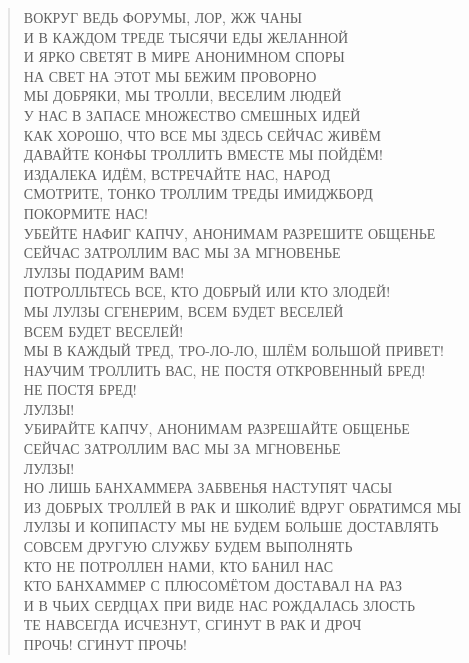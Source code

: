 \poemtitle{***}
\begin{verse}
ВОКРУГ ВЕДЬ ФОРУМЫ, ЛОР, ЖЖ ЧАНЫ\\
И В КАЖДОМ ТРЕДЕ ТЫСЯЧИ ЕДЫ ЖЕЛАННОЙ\\
И ЯРКО СВЕТЯТ В МИРЕ АНОНИМНОМ СПОРЫ\\
НА СВЕТ НА ЭТОТ МЫ БЕЖИМ ПРОВОРНО\\
МЫ ДОБРЯКИ, МЫ ТРОЛЛИ, ВЕСЕЛИМ ЛЮДЕЙ\\
У НАС В ЗАПАСЕ МНОЖЕСТВО СМЕШНЫХ ИДЕЙ\\
КАК ХОРОШО, ЧТО ВСЕ МЫ ЗДЕСЬ СЕЙЧАС ЖИВЁМ\\
ДАВАЙТЕ КОНФЫ ТРОЛЛИТЬ ВМЕСТЕ МЫ ПОЙДЁМ!\\
ИЗДАЛЕКА ИДЁМ, ВСТРЕЧАЙТЕ НАС, НАРОД\\
СМОТРИТЕ, ТОНКО ТРОЛЛИМ ТРЕДЫ ИМИДЖБОРД\\
ПОКОРМИТЕ НАС!\\
УБЕЙТЕ НАФИГ КАПЧУ, АНОНИМАМ РАЗРЕШИТЕ ОБЩЕНЬЕ\\
СЕЙЧАС ЗАТРОЛЛИМ ВАС МЫ ЗА МГНОВЕНЬЕ\\
ЛУЛЗЫ ПОДАРИМ ВАМ!\\
ПОТРОЛЛЬТЕСЬ ВСЕ, КТО ДОБРЫЙ ИЛИ КТО ЗЛОДЕЙ!\\
МЫ ЛУЛЗЫ СГЕНЕРИМ, ВСЕМ БУДЕТ ВЕСЕЛЕЙ\\
ВСЕМ БУДЕТ ВЕСЕЛЕЙ!\\
МЫ В КАЖДЫЙ ТРЕД, ТРО-ЛО-ЛО, ШЛЁМ БОЛЬШОЙ ПРИВЕТ!\\
НАУЧИМ ТРОЛЛИТЬ ВАС, НЕ ПОСТЯ ОТКРОВЕННЫЙ БРЕД!\\
НЕ ПОСТЯ БРЕД!\\
ЛУЛЗЫ!\\
УБИРАЙТЕ КАПЧУ, АНОНИМАМ РАЗРЕШАЙТЕ ОБЩЕНЬЕ\\
СЕЙЧАС ЗАТРОЛЛИМ ВАС МЫ ЗА МГНОВЕНЬЕ\\
ЛУЛЗЫ!\\
НО ЛИШЬ БАНХАММЕРА ЗАБВЕНЬЯ НАСТУПЯТ ЧАСЫ\\
ИЗ ДОБРЫХ ТРОЛЛЕЙ В РАК И ШКОЛИЁ ВДРУГ ОБРАТИМСЯ МЫ\\
ЛУЛЗЫ И КОПИПАСТУ МЫ НЕ БУДЕМ БОЛЬШЕ ДОСТАВЛЯТЬ\\
СОВСЕМ ДРУГУЮ СЛУЖБУ БУДЕМ ВЫПОЛНЯТЬ\\
КТО НЕ ПОТРОЛЛЕН НАМИ, КТО БАНИЛ НАС\\
КТО БАНХАММЕР С ПЛЮСОМЁТОМ ДОСТАВАЛ НА РАЗ\\
И В ЧЬИХ СЕРДЦАХ ПРИ ВИДЕ НАС РОЖДАЛАСЬ ЗЛОСТЬ\\
ТЕ НАВСЕГДА ИСЧЕЗНУТ, СГИНУТ В РАК И ДРОЧ\\
ПРОЧЬ! СГИНУТ ПРОЧЬ!
\end{verse}

